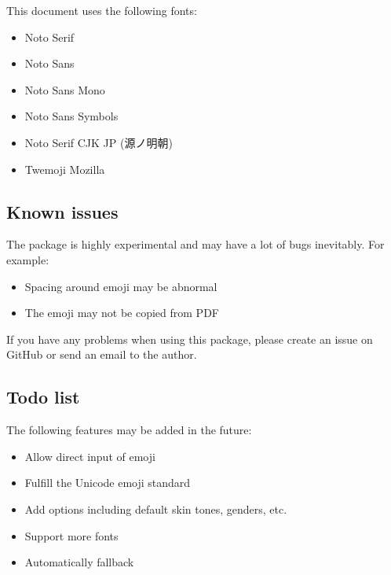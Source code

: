 \documentclass{l3doc}
\newcounter { emoji }
\begin{document}
\endgroup

This document uses the following fonts:

\begin{itemize}
  \item Noto Serif
  \item Noto Sans
  \item Noto Sans Mono
  \item Noto Sans Symbols
  \item Noto Serif CJK JP ({\fontja 源ノ明朝})
  \item Twemoji Mozilla
\end{itemize}

\subsection{ Known issues}

The  package is highly experimental and may have a lot of bugs inevitably. For example:

\begin{itemize}
  \item Spacing around emoji may be abnormal
  \item The emoji may not be copied from PDF
\end{itemize}

If you have any problems when using this package, please create an issue on GitHub or send
an email to the author.

\subsection{ Todo list}

The following features may be added in the future:

\begin{itemize}
  \item Allow direct input of emoji
  \item Fulfill the Unicode emoji standard
  \item Add options including default skin tones, genders, etc.
  \item Support more fonts
  \item Automatically fallback
\end{itemize}
\end{document}
